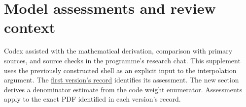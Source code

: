\documentclass[11pt]{article}
\begin{document}








\section*{Model assessments and review context}
Codex assisted with the mathematical derivation, comparison with primary
sources, and source checks in the programme's research chat. This supplement
uses the previously constructed shell as an explicit input to the interpolation
argument. The \href{https://airr.science/papers/ARR-2026-2SH3CGGBHG9Q5BYN/versions/v1/}{first version's record} identifies its assessment. The new section derives a denominator estimate from the code weight enumerator. Assessments apply to the exact PDF identified in each version's record.
\end{document}
